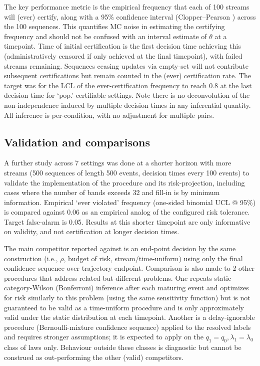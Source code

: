 The key performance metric is the empirical frequency that each of 100 streams will (ever) certify, along with a 95\% confidence interval (Clopper--Pearson \citep{clopper1934}) across the 100 sequences. This quantifies MC noise in estimating the certifying frequency and should not be confused with an interval estimate of $\theta$ at a timepoint. Time of initial certification is the first decision time achieving this (administratively censored if only achieved at the final timepoint), with failed streams remaining. Sequences ceasing updates via empty-set will not contribute subsequent certifications but remain counted in the (ever) certification rate. The target was for the LCL of the ever-certification frequency to reach 0.8 at the last decision time for `pop.'-certifiable settings. Note there is no deconvolution of the non-independence induced by multiple decision times in any inferential quantity. All inference is per-condition, with no adjustment for multiple pairs.

\subsection{Validation and comparisons} 
A further study across 7 settings was done at a shorter horizon with more streams (500 sequences of length 500 events, decision times every 100 events) to validate the implementation of the procedure and its risk-projection, including cases where the number of bands exceeds 32 and fill-in is by minimum information. Empirical `ever violated' frequency (one-sided binomial UCL @ 95\%) is compared against 0.06 as an empirical analog of the configured risk tolerance. Target false-alarm is 0.05. Results at this shorter timepoint are only informative on validity, and not certification at longer decision times.

The main competitor reported against is an end-point decision by the same construction (i.e., $\rho$, budget of risk, stream/time-uniform) using only the final confidence sequence over trajectory endpoint. Comparison is also made to 2 other procedures that address related-but-different problems. One repeats static category-Wilson (Bonferroni) inference after each maturing event and optimizes for risk similarly to this problem (using the same sensitivity function) but is not guaranteed to be valid as a time-uniform procedure and is only approximately valid under the static distribution at each timepoint. Another is a delay-ignorable procedure (Bernoulli-mixture confidence sequence) applied to the resolved labels and requires stronger assumptions; it is expected to apply on the $q_1=q_0, \lambda_1 = \lambda_0$ class of laws only. Behaviour outside these classes is diagnostic but cannot be construed as out-performing the other (valid) competitors.

